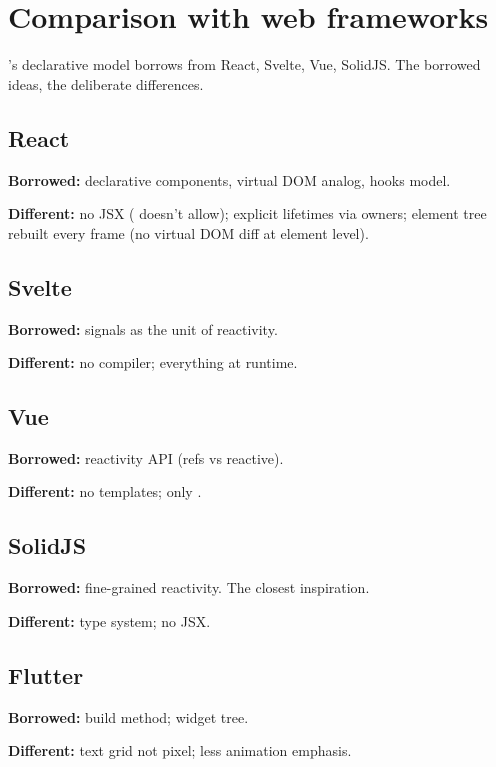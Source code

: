 \chapter{Comparison with web frameworks}
\label{ch:web}

\begin{aside}
\maya{}'s declarative model borrows from React, Svelte, Vue,
SolidJS. The borrowed ideas, the deliberate differences.
\end{aside}

\section{React}

\textbf{Borrowed:} declarative components, virtual DOM
analog, hooks model.

\textbf{Different:} no JSX (\cpp{} doesn't allow);
explicit lifetimes via owners; element tree rebuilt every
frame (no virtual DOM diff at element level).

\section{Svelte}

\textbf{Borrowed:} signals as the unit of reactivity.

\textbf{Different:} no compiler; everything at runtime.

\section{Vue}

\textbf{Borrowed:} reactivity API (refs vs reactive).

\textbf{Different:} no templates; only \cpp{}.

\section{SolidJS}

\textbf{Borrowed:} fine-grained reactivity. The closest
inspiration.

\textbf{Different:} \cpp{} type system; no JSX.

\section{Flutter}

\textbf{Borrowed:} build method; widget tree.

\textbf{Different:} text grid not pixel; less animation
emphasis.

